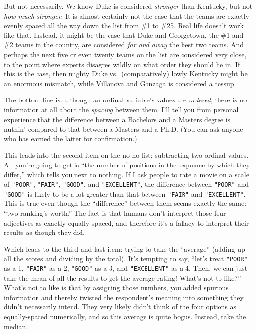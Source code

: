 But not necessarily. We know Duke is considered \textit{stronger} than
Kentucky, but not \textit{how much stronger}. It is almost certainly not the
case that the teams are exactly evenly spaced all the way down the list from
\#1 to \#25. Real life doesn't work like that. Instead, it might be the case
that Duke and Georgetown, the \#1 and \#2 teams in the country, are considered
\textit{far and away} the best two teams. And perhaps the next five or even
twenty teams on the list are considered very close, to the point where experts
disagree wildly on what order they should be in. If this is the case, then
mighty Duke vs.~(comparatively) lowly Kentucky might be an enormous mismatch,
while Villanova and Gonzaga is considered a tossup.

The bottom line is: although an ordinal variable's values are \textit{ordered},
there is no information at all about the \textit{spacing} between them. I'll
tell you from personal experience that the difference between a Bachelors and a
Masters degree is nuthin' compared to that between a Masters and a Ph.D. (You
can ask anyone who has earned the latter for confirmation.)

This leads into the second item on the no-no list: subtracting two ordinal
values. All you're going to get is ``the number of positions in the sequence by
which they differ,'' which tells you next to nothing. If I ask people to rate a
movie on a scale of \texttt{"POOR"}, \texttt{"FAIR"}, \texttt{"GOOD"}, and
\texttt{"EXCELLENT"}, the difference between \texttt{"POOR"} and
\texttt{"GOOD"} is likely to be a lot greater than that between \texttt{"FAIR"}
and \texttt{"EXCELLENT"}. This is true even though the ``difference'' between
them seems exactly the same: ``two ranking's worth.'' The fact is that humans
don't interpret those four adjectives as exactly equally spaced, and therefore
it's a fallacy to interpret their results as though they did.

Which leads to the third and last item: trying to take the ``average'' (adding
up all the scores and dividing by the total). It's tempting to say, ``let's
treat \texttt{"POOR"} as a 1, \texttt{"FAIR"} as a 2, \texttt{"GOOD"} as a 3,
and \texttt{"EXCELLENT"} as a 4. Then, we can just take the mean of all the
results to get the average rating! What's not to like?'' What's not to like is
that by assigning those numbers, you added spurious information and thereby
twisted the respondent's meaning into something they didn't necessarily intend.
They very likely didn't think of the four options as equally-spaced
numerically, and so this average is quite bogus. Instead, take the median.

